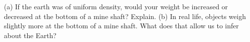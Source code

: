 (a) If the earth was of uniform density, would your
weight be increased or decreased at the bottom of a mine
shaft? Explain.\hwendpart
 (b) In real life, objects weigh slightly
more at the bottom of a mine shaft. What does that allow us
to infer about the Earth?
